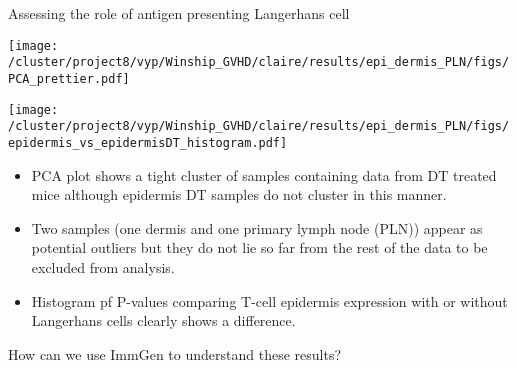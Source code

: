 \documentclass[final,hyperref={pdfpagelabels=false}]{beamer}
\begin{document}
\begin{frame}{}
\begin{columns}[t]
\begin{column}{.36\linewidth}
\begin{block}{Assessing the role of antigen presenting Langerhans cell}


\hfill

\begin{minipage}{0.45\textwidth}
       \texttt{[image: /cluster/project8/vyp/Winship\_GVHD/claire/results/epi\_dermis\_PLN/figs/PCA\_prettier.pdf]}
      \end{minipage}
      \begin{minipage}{0.45\textwidth}
        \texttt{[image: /cluster/project8/vyp/Winship\_GVHD/claire/results/epi\_dermis\_PLN/figs/epidermis\_vs\_epidermisDT\_histogram.pdf]}
      \end{minipage}

{\small
      \begin{itemize}
      \item PCA plot shows a tight cluster of samples containing data from DT treated mice although epidermis DT samples do not cluster in this manner.
      \item Two samples (one dermis and one primary lymph node (PLN)) appear as potential outliers but they do not lie so far from the rest of the data to be excluded from analysis.
  \item Histogram pf P-values comparing T-cell epidermis expression with or without Langerhans cells clearly shows a difference.
      \end{itemize}}
\end{block}

    \begin{block}{How can we use ImmGen to understand these results?}
  

\end{block}
\end{column}
\end{columns}
\end{frame}
\end{document}
